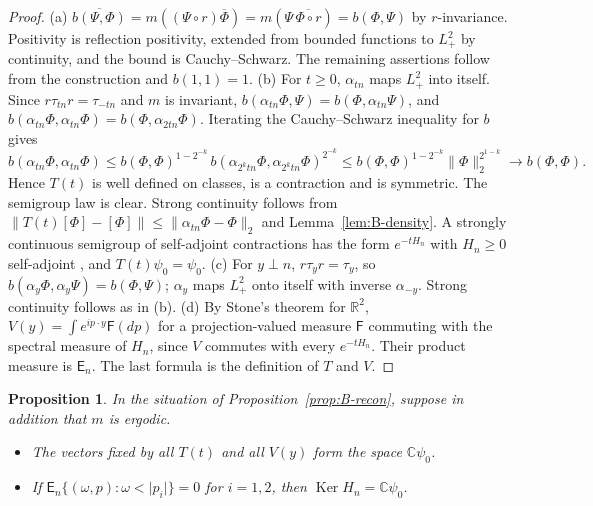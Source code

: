 \documentclass[11pt]{amsart}
\theoremstyle{plain}
\newtheorem{proposition}[theorem]{Proposition}
\theoremstyle{definition}
\theoremstyle{remark}
\numberwithin{equation}{section}
\newcommand{\R}{\mathbb{R}}
\newcommand{\C}{\mathbb{C}}
\newcommand{\abs}[1]{\lvert #1\rvert}
\newcommand{\norm}[1]{\lVert #1\rVert}
\newcommand{\Ker}{\operatorname{Ker}}
\begin{document}
\begin{proof}
(a) $\overline{b(\Psi,\Phi)}=m((\Psi\circ r)\overline\Phi)=m(\Psi\,\overline{\Phi\circ r})=b(\Phi,\Psi)$ by $r$-invariance. Positivity is reflection positivity, extended from bounded functions to $L^2_+$ by continuity, and the bound is Cauchy--Schwarz. The remaining assertions follow from the construction and $b(1,1)=1$.
(b) For $t\ge0$, $\alpha_{tn}$ maps $L^2_+$ into itself. Since $r\tau_{tn}r=\tau_{-tn}$ and $m$ is invariant, $b(\alpha_{tn}\Phi,\Psi)=b(\Phi,\alpha_{tn}\Psi)$, and $b(\alpha_{tn}\Phi,\alpha_{tn}\Phi)=b(\Phi,\alpha_{2tn}\Phi)$. Iterating the Cauchy--Schwarz inequality for $b$ gives
\[
b(\alpha_{tn}\Phi,\alpha_{tn}\Phi)\le b(\Phi,\Phi)^{1-2^{-k}}\,b(\alpha_{2^ktn}\Phi,\alpha_{2^ktn}\Phi)^{2^{-k}}\le b(\Phi,\Phi)^{1-2^{-k}}\norm\Phi_2^{2^{1-k}}\to b(\Phi,\Phi).
\]
Hence $T(t)$ is well defined on classes, is a contraction and is symmetric. The semigroup law is clear. Strong continuity follows from $\norm{T(t)[\Phi]-[\Phi]}\le\norm{\alpha_{tn}\Phi-\Phi}_2$ and Lemma~\ref{lem:B-density}. A strongly continuous semigroup of self-adjoint contractions has the form $e^{-tH_n}$ with $H_n\ge0$ self-adjoint \cite[Thm.~6.1.3, pp.~94--95]{GJ}, and $T(t){\psi_0}={\psi_0}$.
(c) For $y\perp n$, $r\tau_yr=\tau_y$, so $b(\alpha_y\Phi,\alpha_y\Psi)=b(\Phi,\Psi)$; $\alpha_y$ maps $L^2_+$ onto itself with inverse $\alpha_{-y}$. Strong continuity follows as in (b).
(d) By Stone's theorem for $\R^2$, $V(y)=\int e^{ip\cdot y}\mathsf F(dp)$ for a projection-valued measure $\mathsf F$ commuting with the spectral measure of $H_n$, since $V$ commutes with every $e^{-tH_n}$. Their product measure is $\mathsf E_n$. The last formula is the definition of $T$ and $V$.
\end{proof}

\begin{proposition}\label{prop:B-zero}
In the situation of Proposition~\ref{prop:B-recon}, suppose in addition that $m$ is ergodic.
\begin{itemize}
\item[(a)] The vectors fixed by all $T(t)$ and all $V(y)$ form the space $\C{\psi_0}$.
\item[(b)] If $\mathsf E_n\{(\omega,p):\omega<\abs{p_i}\}=0$ for $i=1,2$, then $\Ker H_n=\C{\psi_0}$.
\end{itemize}
\end{proposition}
\end{document}
